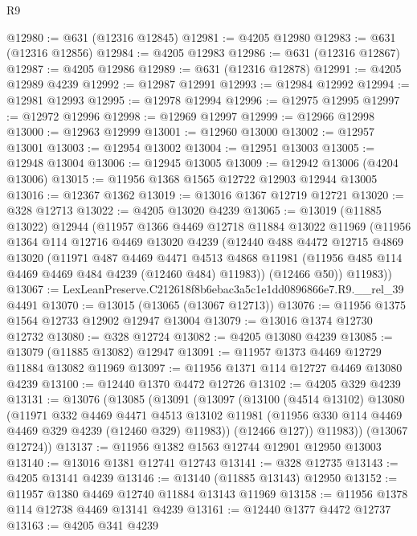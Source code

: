 \begin{lexlean}{R9}
\begin{coremodule}
@12980 := @631 (@12316 @12845)
@12981 := @4205 @12980
@12983 := @631 (@12316 @12856)
@12984 := @4205 @12983
@12986 := @631 (@12316 @12867)
@12987 := @4205 @12986
@12989 := @631 (@12316 @12878)
@12991 := @4205 @12989 @4239
@12992 := @12987 @12991
@12993 := @12984 @12992
@12994 := @12981 @12993
@12995 := @12978 @12994
@12996 := @12975 @12995
@12997 := @12972 @12996
@12998 := @12969 @12997
@12999 := @12966 @12998
@13000 := @12963 @12999
@13001 := @12960 @13000
@13002 := @12957 @13001
@13003 := @12954 @13002
@13004 := @12951 @13003
@13005 := @12948 @13004
@13006 := @12945 @13005
@13009 := @12942 @13006 (@4204 @13006)
@13015 := @11956 @1368 @1565 @12722 @12903 @12944 @13005
@13016 := @12367 @1362
@13019 := @13016 @1367 @12719 @12721
@13020 := @328 @12713
@13022 := @4205 @13020 @4239
@13065 := @13019
    (@11885 @13022)
    @12944
    (@11957
      @1366
      @4469
      @12718
      @11884
      @13022
      @11969
      (@11956
        @1364
        @114
        @12716
        @4469
        @13020
        @4239
        (@12440
          @488
          @4472
          @12715
          @4869
          @13020
          (@11971
            @487
            @4469
            @4471
            @4513
            @4868
            @11981
            (@11956 @485 @114 @4469 @4469 @484 @4239 (@12460 @484) @11983))
          (@12466 @50))
        @11983))
@13067 := LexLeanPreserve.C212618f8b6ebac3a5c1e1dd0896866e7.R9.__rel_39 @4491
@13070 := @13015 (@13065 (@13067 @12713))
@13076 := @11956 @1375 @1564 @12733 @12902 @12947 @13004
@13079 := @13016 @1374 @12730 @12732
@13080 := @328 @12724
@13082 := @4205 @13080 @4239
@13085 := @13079 (@11885 @13082) @12947
@13091 := @11957 @1373 @4469 @12729 @11884 @13082 @11969
@13097 := @11956 @1371 @114 @12727 @4469 @13080 @4239
@13100 := @12440 @1370 @4472 @12726
@13102 := @4205 @329 @4239
@13131 := @13076
    (@13085
      (@13091
        (@13097
          (@13100
            (@4514 @13102)
            @13080
            (@11971
              @332
              @4469
              @4471
              @4513
              @13102
              @11981
              (@11956 @330 @114 @4469 @4469 @329 @4239 (@12460 @329) @11983))
            (@12466 @127))
          @11983))
      (@13067 @12724))
@13137 := @11956 @1382 @1563 @12744 @12901 @12950 @13003
@13140 := @13016 @1381 @12741 @12743
@13141 := @328 @12735
@13143 := @4205 @13141 @4239
@13146 := @13140 (@11885 @13143) @12950
@13152 := @11957 @1380 @4469 @12740 @11884 @13143 @11969
@13158 := @11956 @1378 @114 @12738 @4469 @13141 @4239
@13161 := @12440 @1377 @4472 @12737
@13163 := @4205 @341 @4239

\end{coremodule}
\end{lexlean}
